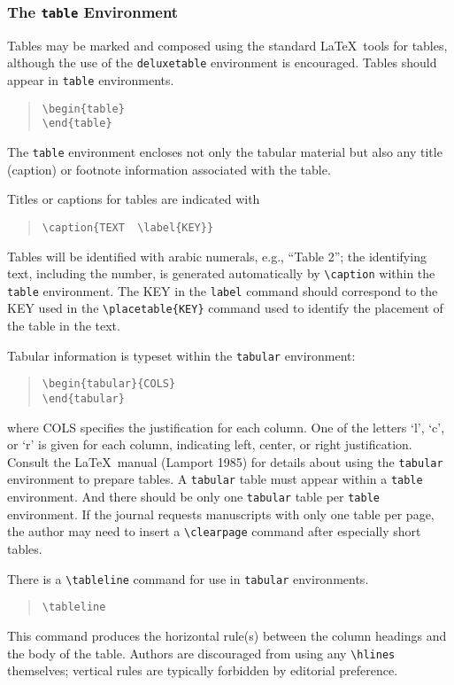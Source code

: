 \subsubsection{The {\tt table} Environment}

Tables may be marked and composed using the standard \LaTeX\ tools for tables,
although the use of the {\tt deluxetable} environment is encouraged.
Tables should appear in {\tt table} environments.
\begin{quote}
\verb"\begin{table}"\\
\verb"\end{table}"
\end{quote}
The {\tt table} environment encloses not only the tabular
material but also any title (caption) or footnote information
associated with the table.

Titles or captions for tables are indicated with
\begin{quote}
\verb"\caption{TEXT  \label{KEY}}"
\end{quote}
Tables will be identified with arabic numerals, e.g., ``Table 2'';
the identifying text, including the number, is generated automatically
by \verb"\caption" within the \verb"table" environment.
The {\small KEY} in the {\tt label} command should correspond to the 
{\small KEY}
used in the \verb"\placetable{KEY}" command used to identify the placement 
of the table in the
text.

Tabular information is typeset within the
{\tt tabular} environment:
\begin{quote}
\verb"\begin{tabular}{COLS}"\\
\verb"\end{tabular}"
\end{quote}
where {\small COLS} specifies the justification for each column.
One of the letters `l', `c', or `r' is given for each column,
indicating left, center, or right justification.
Consult the \LaTeX\ manual (Lamport 1985) for details about using
the {\tt tabular} environment to prepare tables.
A {\tt tabular} table must appear within a {\tt table} environment.
And there should be only one {\tt tabular} table per {\tt table} environment.
If the journal requests manuscripts with only one table per page,
the author may need to insert a \verb"\clearpage" command after
especially short tables.

There is a \verb"\tableline" command for use in {\tt tabular}
environments.
\begin{quote}
\verb"\tableline"
\end{quote}
This command produces the horizontal rule(s) between the column headings
and the body of the table.
Authors are discouraged from using any \verb"\hlines" themselves;
vertical rules are typically forbidden by editorial preference.

